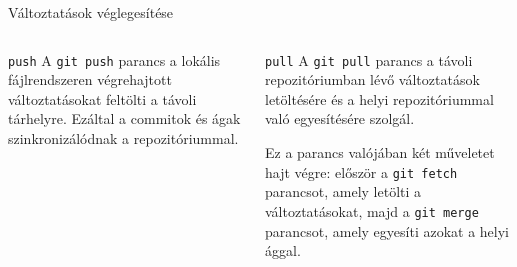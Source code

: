 \documentclass[english, aspectratio=169]{beamer}
\begin{document}
\begin{frame}{Változtatások véglegesítése}
\begin{columns}
\begin{column}{.5\textwidth}
\begin{block}{\texttt{push}}
A \texttt{git push} parancs a lokális fájlrendszeren végrehajtott változtatásokat feltölti a távoli tárhelyre. Ezáltal a commitok és ágak szinkronizálódnak a repozitóriummal.
\end{block}
\end{column}
\begin{column}{.5\textwidth}
\begin{block}{\texttt{pull}}
A \texttt{git pull} parancs a távoli repozitóriumban lévő változtatások letöltésére és a helyi repozitóriummal való egyesítésére szolgál.\par \smallskip
Ez a parancs valójában két műveletet hajt végre: először a \texttt{git fetch} parancsot, amely letölti a változtatásokat, majd a \texttt{git merge} parancsot, amely egyesíti azokat a helyi ággal.
\end{block}
\end{column}
\end{columns}
\end{frame}
\end{document}

